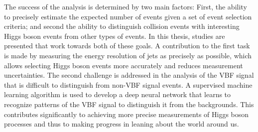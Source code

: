 The success of the \HWWdet analysis is determined by two main factors: 
First, the ability to precisely estimate the expected number of events given a set of event selection criteria; and second the ability to distinguish collision events with interesting Higgs boson events from other types of events.
In this thesis, studies are presented that work towards both of these goals.
A contribution to the first task is made by measuring the energy resolution of jets as precisely as possible, which allows selecting Higgs boson events more accurately and reduces measurement uncertainties.
The second challenge is addressed in the analysis of the VBF signal that is difficult to distinguish from non-VBF signal events. 
A supervised machine learning algorithm is used to develop a deep neural network that learns to recognize patterns of the VBF signal to distinguish it from the backgrounds.
This contributes significantly to achieving more precise measurements of Higgs boson processes and thus to making progress in leaning about the world around us. 




